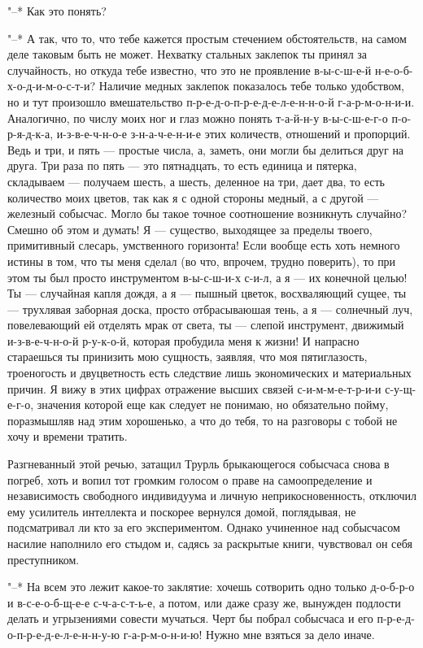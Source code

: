 "--* Как это понять?

"--* А так, что то, что тебе кажется простым стечением
обстоятельств, на самом деле таковым быть не может. Нехватку
стальных заклепок ты принял за случайность, но откуда тебе
известно, что это не проявление в-ы-с-ш-е-й
н-е-о-б-х-о-д-и-м-о-с-т-и? Наличие медных заклепок
показалось тебе только удобством, но и тут произошло
вмешательство п-р-е-д-о-п-р-е-д-е-л-е-н-н-о-й
г-а-р-м-о-н-и-и. Аналогично, по числу моих ног и глаз можно
понять т-а-й-н-у в-ы-с-ш-е-г-о п-о-р-я-д-к-а,
и-з-в-е-ч-н-о-е з-н-а-ч-е-н-и-е этих количеств, отношений и
пропорций. Ведь и три, и пять --- простые числа, а, заметь, они
могли бы делиться друг на друга. Три раза по пять --- это
пятнадцать, то есть единица и пятерка, складываем --- получаем
шесть, а шесть, деленное на три, дает два, то есть
количество моих цветов, так как я с одной стороны медный, а
с другой --- железный собысчас. Могло бы такое точное
соотношение возникнуть случайно? Смешно об этом и думать! Я --- существо,
выходящее за пределы твоего, примитивный
слесарь, умственного горизонта! Если вообще есть хоть
немного истины в том, что ты меня сделал (во что, впрочем,
трудно поверить), то при этом ты был просто инструментом
в-ы-с-ш-и-х с-и-л, а я --- их конечной целью! Ты --- случайная
капля дождя, а я --- пышный цветок, восхваляющий сущее, ты --- трухлявая
заборная доска, просто отбрасываюшая тень, а я --- солнечный
луч, повелевающий ей отделять мрак от света, ты --- слепой
инструмент, движимый и-з-в-е-ч-н-о-й р-у-к-о-й,
которая пробудила меня к жизни! И напрасно стараешься ты
принизить мою сущность, заявляя, что моя пятиглазость,
троеногость и двуцветность есть следствие лишь экономических
и материальных причин. Я вижу в этих цифрах отражение высших
связей с-и-м-м-е-т-р-и-и с-у-щ-е-г-о, значения которой еще
как следует не понимаю, но обязательно пойму, поразмышляв
над этим хорошенько, а что до тебя, то на разговоры с тобой
не хочу и времени тратить.

Разгневанный этой речью, затащил Трурль брыкающегося
собысчаса снова в погреб, хоть и вопил тот громким голосом о
праве на самоопределение и независимость свободного
индивидуума и личную неприкосновенность, отключил ему
усилитель интеллекта и поскорее вернулся домой, поглядывая,
не подсматривал ли кто за его экспериментом. Однако
учиненное над собысчасом насилие наполнило его стыдом и,
садясь за раскрытые книги, чувствовал он себя преступником.

"--*  На
всем это лежит какое-то заклятие: хочешь сотворить
одно только д-о-б-р-о и в-с-е-о-б-щ-е-е с-ч-а-с-т-ь-е, а
потом, или даже сразу же, вынужден подлости делать и
угрызениями совести мучаться. Черт бы побрал собысчаса и его
п-р-е-д-о-п-р-е-д-е-л-е-н-н-у-ю г-а-р-м-о-н-и-ю! Нужно мне
взяться за дело иначе.

